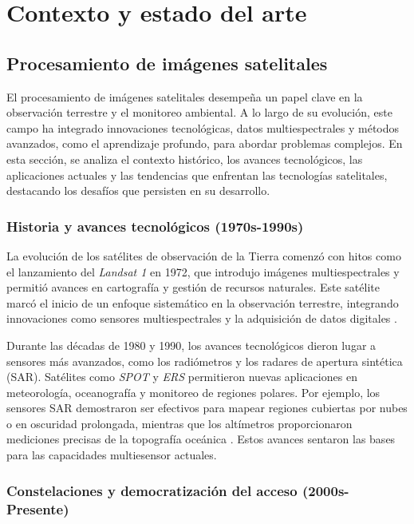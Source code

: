 \chapter{Contexto y estado del arte}

\section{Procesamiento de imágenes satelitales}
    
    El procesamiento de imágenes satelitales desempeña un papel clave en la observación terrestre y el monitoreo ambiental. A lo largo de su evolución, este campo ha integrado innovaciones tecnológicas, datos multiespectrales y métodos avanzados, como el aprendizaje profundo, para abordar problemas complejos. En esta sección, se analiza el contexto histórico, los avances tecnológicos, las aplicaciones actuales y las tendencias que enfrentan las tecnologías satelitales, destacando los desafíos que persisten en su desarrollo.

    \subsection{Historia y avances tecnológicos (1970s-1990s)}

        La evolución de los satélites de observación de la Tierra comenzó con hitos como el lanzamiento del \textit{Landsat 1} en 1972, que introdujo imágenes multiespectrales y permitió avances en cartografía y gestión de recursos naturales. Este satélite marcó el inicio de un enfoque sistemático en la observación terrestre, integrando innovaciones como sensores multiespectrales y la adquisición de datos digitales \autocite{wulder2022fifty}.

        Durante las décadas de 1980 y 1990, los avances tecnológicos dieron lugar a sensores más avanzados, como los radiómetros y los radares de apertura sintética (SAR). Satélites como \textit{SPOT} y \textit{ERS} permitieron nuevas aplicaciones en meteorología, oceanografía y monitoreo de regiones polares. Por ejemplo, los sensores SAR demostraron ser efectivos para mapear regiones cubiertas por nubes o en oscuridad prolongada, mientras que los altímetros proporcionaron mediciones precisas de la topografía oceánica \autocite{amani2022remote}. Estos avances sentaron las bases para las capacidades multiesensor actuales.

    \subsection{Constelaciones y democratización del acceso (2000s-Presente)}

